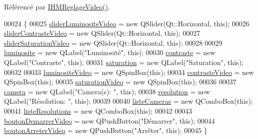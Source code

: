 Référencé par \hyperlink{ihmreglagevideo_8cpp_source_l00009}{I\+H\+M\+Reglage\+Video()}.


\begin{DoxyCode}
00024 \{
00025     \hyperlink{class_i_h_m_reglage_video_a333b7f1b3239abd5823e0b0f2857716b}{sliderLuminositeVideo} = \textcolor{keyword}{new} QSlider(Qt::Horizontal, \textcolor{keyword}{this});
00026     \hyperlink{class_i_h_m_reglage_video_a69917b4179132a63efe6c3fb63ba666a}{sliderContrasteVideo} = \textcolor{keyword}{new} QSlider(Qt::Horizontal, \textcolor{keyword}{this});
00027     \hyperlink{class_i_h_m_reglage_video_aba60de0eccec35f165101b10c0cd33df}{sliderSaturationVideo} = \textcolor{keyword}{new} QSlider(Qt::Horizontal, \textcolor{keyword}{this});
00028 
00029     \hyperlink{class_i_h_m_reglage_video_a16b65877af48863d0752e226371952ab}{luminosite} = \textcolor{keyword}{new} QLabel(\textcolor{stringliteral}{"Luminosité"}, \textcolor{keyword}{this});
00030     \hyperlink{class_i_h_m_reglage_video_ad1aa173a98ced9f3aaeccb0c2712093c}{contraste} = \textcolor{keyword}{new} QLabel(\textcolor{stringliteral}{"Contraste"}, \textcolor{keyword}{this});
00031     \hyperlink{class_i_h_m_reglage_video_a452450793da1908cfe89fb9984b914d1}{saturation} = \textcolor{keyword}{new} QLabel(\textcolor{stringliteral}{"Saturation"}, \textcolor{keyword}{this});
00032 
00033     \hyperlink{class_i_h_m_reglage_video_a9109c0801d582917e78e57c350510ea7}{luminositeVideo} = \textcolor{keyword}{new} QSpinBox(\textcolor{keyword}{this});
00034     \hyperlink{class_i_h_m_reglage_video_a617e9dbd5a92c35e7e351228354deb63}{contrasteVideo} = \textcolor{keyword}{new} QSpinBox(\textcolor{keyword}{this});
00035     \hyperlink{class_i_h_m_reglage_video_a058bd2a65aefa5f95ff73851f156064c}{saturationVideo} = \textcolor{keyword}{new} QSpinBox(\textcolor{keyword}{this});
00036 
00037     \hyperlink{class_i_h_m_reglage_video_a5a57047117d423ba8bf62bbcb2baee74}{camera} = \textcolor{keyword}{new} QLabel(\textcolor{stringliteral}{"Camera(s): "}, \textcolor{keyword}{this});
00038     \hyperlink{class_i_h_m_reglage_video_a7fd79309e9501b8cb340ae61b96c0366}{resolution} = \textcolor{keyword}{new} QLabel(\textcolor{stringliteral}{"Résolution: "}, \textcolor{keyword}{this});
00039 
00040     \hyperlink{class_i_h_m_reglage_video_a38a35548ddd0e5750917305ac6f32142}{listeCameras} = \textcolor{keyword}{new} QComboBox(\textcolor{keyword}{this});
00041     \hyperlink{class_i_h_m_reglage_video_ad897355a4350d95f5f219db57ff68d4f}{listeResolutions} = \textcolor{keyword}{new} QComboBox(\textcolor{keyword}{this});
00042 
00043     \hyperlink{class_i_h_m_reglage_video_a98d33390551ab92165f192be44f6361d}{boutonDemarrerVideo} = \textcolor{keyword}{new} QPushButton(\textcolor{stringliteral}{"Démarrer"}, \textcolor{keyword}{this});
00044     \hyperlink{class_i_h_m_reglage_video_a705db68dd445a91a4144a3c9bf95a9cf}{boutonArreterVideo} = \textcolor{keyword}{new} QPushButton(\textcolor{stringliteral}{"Arrêter"}, \textcolor{keyword}{this});
00045 \}
\end{DoxyCode}
